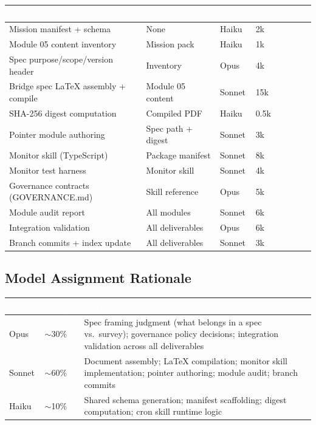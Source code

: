 \documentclass[11pt,letterpaper]{article}
\newcommand{\tableheader}[1]{\textbf{\sffamily\textcolor{white}{#1}}}
\begin{document}
\begin{center}
\begin{tabularx}{\textwidth}{L{3.5cm}L{2.5cm}C{1.5cm}C{2cm}}
\toprule
{}
\tableheader{Component} & \tableheader{Dependencies} & \tableheader{Model} & \tableheader{Est.\ Tokens} \\
\midrule
Mission manifest + schema & None & Haiku & 2k \\
Module 05 content inventory & Mission pack & Haiku & 1k \\
Spec purpose/scope/version header & Inventory & Opus & 4k \\
Bridge spec LaTeX assembly + compile & Module 05 content & Sonnet & 15k \\
SHA-256 digest computation & Compiled PDF & Haiku & 0.5k \\
Pointer module authoring & Spec path + digest & Sonnet & 3k \\
Monitor skill (TypeScript) & Package manifest & Sonnet & 8k \\
Monitor test harness & Monitor skill & Sonnet & 4k \\
Governance contracts (GOVERNANCE.md) & Skill reference & Opus & 5k \\
Module audit report & All modules & Sonnet & 6k \\
Integration validation & All deliverables & Opus & 6k \\
Branch commits + index update & All deliverables & Sonnet & 3k \\
\bottomrule
\end{tabularx}
\end{center}

\subsection{Model Assignment Rationale}

\begin{center}
\begin{tabularx}{\textwidth}{L{2cm}C{1.5cm}X}
\toprule
{}
\tableheader{Model} & \tableheader{Budget} & \tableheader{Rationale} \\
\midrule
Opus & $\sim$30\% & Spec framing judgment (what belongs in a spec vs.\ survey); governance policy decisions; integration validation across all deliverables \\
Sonnet & $\sim$60\% & Document assembly; LaTeX compilation; monitor skill implementation; pointer authoring; module audit; branch commits \\
Haiku & $\sim$10\% & Shared schema generation; manifest scaffolding; digest computation; cron skill runtime logic \\
\bottomrule
\end{tabularx}
\end{center}
\end{document}
